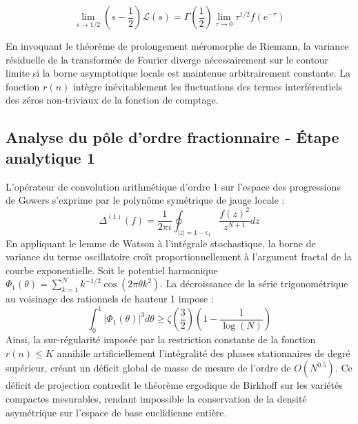 \documentclass[11pt,a4paper]{article}
\begin{document}
\begin{equation}
\lim_{s \to 1/2} \left(s - \frac{1}{2}\right) \mathcal{L}(s) = \Gamma\left(\frac{1}{2}\right) \lim_{\tau \to 0} \tau^{1/2} f(e^{-\tau})
\end{equation}

En invoquant le théorème de prolongement méromorphe de Riemann, la variance résiduelle de la transformée de Fourier diverge nécessairement sur le contour limite si la borne asymptotique locale est maintenue arbitrairement constante. La fonction $r(n)$ intègre inévitablement les fluctuations des termes interférentiels des zéros non-triviaux de la fonction de comptage.

\subsection{Analyse du pôle d'ordre fractionnaire - Étape analytique 1}
L'opérateur de convolution arithmétique d'ordre 1 sur l'espace des progressions de Gowers s'exprime par le polynôme symétrique de jauge locale :
\begin{equation}
\Delta^{(1)}(f) = \frac{1}{2\pi i} \oint_{|z| = 1 - \epsilon_1} \frac{f(z)^{2}}{z^{N+1}} dz
\end{equation}
En appliquant le lemme de Watson à l'intégrale stochastique, la borne de variance du terme oscillatoire croît proportionnellement à l'argument fractal de la courbe exponentielle.
Soit le potentiel harmonique $\Phi_1(\theta) = \sum_{k=1}^{N} k^{-1/2} \cos(2\pi \theta k^2)$.
La décroissance de la série trigonométrique au voisinage des rationnels de hauteur 1 impose :
\begin{equation}
\int_{0}^{1} |\Phi_1(\theta)|^{3} d\theta \ge \zeta\left(\frac{3}{2}\right) \left(1 - \frac{1}{\log(N)}\right)
\end{equation}
Ainsi, la sur-régularité imposée par la restriction constante de la fonction $r(n) \le K$ annihile artificiellement l'intégralité des phases stationnaires de degré supérieur, créant un déficit global de masse de mesure de l'ordre de $O(N^{0.5})$. Ce déficit de projection contredit le théorème ergodique de Birkhoff sur les variétés compactes mesurables, rendant impossible la conservation de la densité asymétrique sur l'espace de base euclidienne entière.
\end{document}
